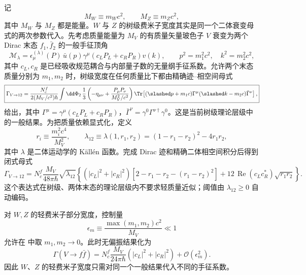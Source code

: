 记
\begin{equation*}
M_W\equiv m_Wc^2,\qquad M_Z\equiv m_Zc^2,
\end{equation*}
其中 $M_W$ 与 $M_Z$ 都是能量。$W$ 与 $Z$ 的树级费米子宽度其实是同一个二体衰变母式的两次参数代入。先考虑质量能量为 $M_V$ 的有质量矢量玻色子 $V$ 衰变为两个 Dirac 末态 $f_1,\bar f_2$ 的一般手征顶角
\begin{equation}
 \mathcal M_\lambda
 =\epsilon_\mu^{(\lambda)}(P)\,
 \bar u(p)\gamma^\mu\!
 \left(c_LP_L+c_RP_R\right)v(k),
 \qquad p^2=m_1^2c^2,\quad k^2=m_2^2c^2,
 \label{eq:generic-vector-ff-amplitude-dp91}
\end{equation}
其中 $c_L,c_R$ 是已经吸收规范耦合与内部量子数的无量纲手征系数。允许两个末态质量分别为 $m_1,m_2$ 时，树级宽度在任何质量比下都由精确迹--相空间母式
\begin{equation}
 \boxed{
 \Gamma_{V\to12}
 =\frac{N_c^f}{2(M_V/c^2)\hbar}
 \int\dd\Phi_2\,
 \frac13\left(-\eta_{\mu\nu}+\frac{P_\mu P_\nu}{M_V^2/c^2}\right)
 \Tr\!\left[(\slashed p+m_1c)\Gamma^\mu
 (\slashed k-m_2c)\bar\Gamma^\nu\right],}
 \label{eq:generic-vector-ff-exact-width-dp92}
\end{equation}
给出，其中 $\Gamma^\mu=\gamma^\mu(c_LP_L+c_RP_R)$，$\bar\Gamma^\nu=\gamma^0\Gamma^{\nu\dagger}\gamma^0$。这是当前树级理论层级中的一般结果。为把质量依赖显式化，定义
\begin{equation*}
 r_i\equiv\frac{m_i^2c^4}{M_V^2},\qquad
 \lambda_{12}\equiv\lambda(1,r_1,r_2)
 =(1-r_1-r_2)^2-4r_1r_2,
\end{equation*}
其中 $\lambda$ 是二体运动学的 Källén 函数。完成 Dirac 迹和精确二体相空间积分后得到闭式母式
\begin{equation}
 \boxed{
 \Gamma_{V\to12}
 =N_c^f\frac{M_V}{48\pi\hbar}\sqrt{\lambda_{12}}
 \left\{
 (|c_L|^2+|c_R|^2)
 \left[2-r_1-r_2-(r_1-r_2)^2\right]
 +12\,\operatorname{Re}(c_Lc_R^*)\sqrt{r_1r_2}
 \right\}.}
 \label{eq:generic-vector-ff-exact-closed-dp92}
\end{equation}
这个表达式在树级、两体末态的理论层级内不要求轻质量近似；阈值由 $\lambda_{12}\ge0$ 自动编码。

对 $W,Z$ 的轻费米子部分宽度，控制量
\begin{equation*}
 \epsilon_m\equiv\frac{\max(m_1,m_2)c^2}{M_V}\ll1
\end{equation*}
允许在 中取 $m_1,m_2\to0$。此时无偏振结果化为
\begin{equation}
 \boxed{
 \Gamma(V\to f\bar f)
 =N_c^f\frac{M_V}{24\pi\hbar}
 \left(|c_L|^2+|c_R|^2\right)
 +\mathcal O(\epsilon_m^2).}
 \label{eq:generic-vector-ff-width-dp91}
\end{equation}
因此 $W$、$Z$ 的轻费米子宽度只需对同一个一般结果代入不同的手征系数。

